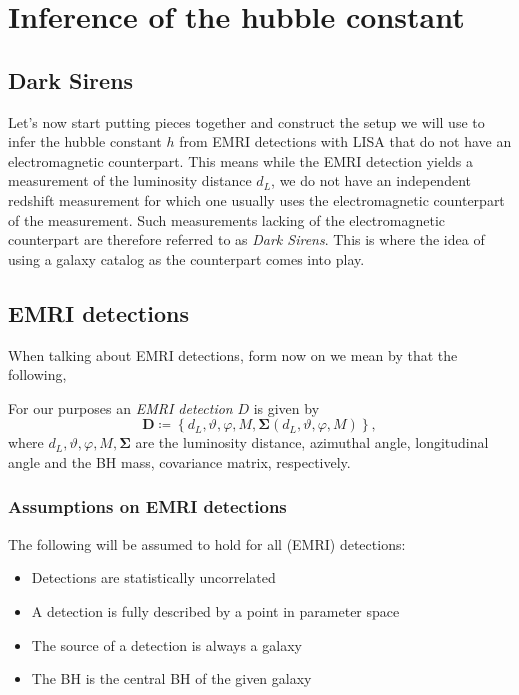\chapter{Inference of the hubble constant}

\section{Dark Sirens}

Let's now start putting pieces together and construct the setup we will use to infer the hubble constant $h$ from EMRI detections with LISA that do not have an electromagnetic counterpart. This means while the EMRI detection yields a measurement of the luminosity distance $d_L$, we do not have an independent redshift measurement for which one usually uses the electromagnetic counterpart of the measurement. Such measurements lacking of the electromagnetic counterpart are therefore referred to as \emph{Dark Sirens}. This is where the idea of using a galaxy catalog as the counterpart comes into play.

\section{EMRI detections}

When talking about EMRI detections, form now on we mean by that the following,
\begin{definition}
    For our purposes an \emph{EMRI detection} $D$ is given by
    \begin{equation}
        \label{eq:emri-detection}
        \bm{D} \coloneqq \left \{ d_L, \vartheta, \varphi, M, \bm{\Sigma} (d_L, \vartheta, \varphi, M)\right \},
    \end{equation}
    where $d_L, \vartheta, \varphi, M, \bm{\Sigma}$ are the luminosity distance, azimuthal angle, longitudinal angle and the BH mass, covariance matrix, respectively.
\end{definition}

\subsection{Assumptions on EMRI detections}
The following will be assumed to hold for all (EMRI) detections:
\begin{itemize}
    \item Detections are statistically uncorrelated
    \item A detection is fully described by a point in parameter space
    \item The source of a detection is always a galaxy
    \item The BH is the central BH of the given galaxy
\end{itemize}

